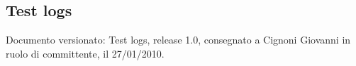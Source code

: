 \subsection{Test logs}
Documento versionato: Test logs, release 1.0, consegnato a Cignoni
Giovanni in ruolo di committente, il 27/01/2010.
